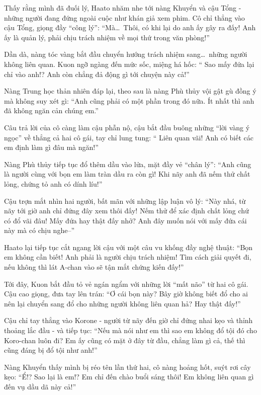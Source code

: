 \documentclass[../main.tex]{subfiles}
\begin{document}
Thấy rằng mình đã đuối lý, Haato nhăm nhe tới nàng Khuyển và cậu Tổng - những người đang đứng ngoài cuộc như khán giả xem phim. Cô chỉ thẳng vào cậu Tổng, giọng đầy ``công lý'': ``Mà\dots\ Thôi, có khi lại do anh ấy gây ra đấy! Anh ấy là quản lý, phải chịu trách nhiệm về mọi thứ trong văn phòng!''

Dần dà, nàng tóc vàng bắt đầu chuyển hướng trách nhiệm sang\dots\ những người không liên quan. Kuon ngỡ ngàng đến mức sốc, miệng há hốc: `` Sao mấy đứa lại chỉ vào anh!? Anh còn chẳng đả động gì tới chuyện này cả!''

Nàng Trung học thản nhiên đáp lại, theo sau là nàng Phù thủy vội gật gù đồng ý mà không suy xét gì: ``Anh cũng phải có một phần trong đó nữa. Ít nhất thì anh đã không ngăn cản chúng em.''

Câu trả lời của cô càng làm cậu phẫn nộ, cậu bắt đầu buông những ``lời vàng ý ngọc'' về thẳng cả hai cô gái, tay chỉ lung tung: `` Liên quan vãi! Anh có biết các em định làm gì đâu mà ngăn!''

Nàng Phù thủy tiếp tục đổ thêm dầu vào lửa, mặt đầy vẻ ``chân lý'': ``Anh cũng là người cùng với bọn em làm tràn dầu ra còn gì! Khi nãy anh đã nếm thử chất lỏng, chứng tỏ anh có dính líu!''

Cậu trợn mắt nhìn hai người, bất mãn với những lập luận vô lý: ``Này nhá, từ nãy tới giờ anh chỉ đứng đây xem thôi đấy! Nếm thử để xác định chất lỏng chứ có đổ vãi đâu! Mấy đứa hay thật đấy nhở? Anh đây muốn nói với mấy đứa cái này mà có chịu nghe--''

Haato lại tiếp tục cắt ngang lời cậu với một câu vu khống đầy nghệ thuật: ``Bọn em không cần biết! Anh phải là người chịu trách nhiệm! Tìm cách giải quyết đi, nếu không thì lát A-chan vào sẽ tận mắt chứng kiến đấy!''

Tới đây, Kuon bắt đầu tỏ vẻ ngán ngẩm với những lời ``mất não'' từ hai cô gái. Cậu cao giọng, đưa tay lên trán: ``Ơ cái bọn này? Bây giờ không biết đổ cho ai nên lại chuyển sang đổ cho những người không liên quan hả? Hay thật đấy!''

Cậu chỉ tay thẳng vào Korone - người từ nãy đến giờ chỉ đứng nhai kẹo và thỉnh thoảng lắc đầu - và tiếp tục: ``Nếu mà nói như em thì sao em không đổ tội đó cho Koro-chan luôn đi? Em ấy cũng có mặt ở đây từ đầu, chẳng làm gì cả, thế thì cũng đáng bị đổ tội như anh!''

Nàng Khuyển thấy mình bị réo tên lần thứ hai, cô nàng hoảng hốt, suýt rơi cây kẹo: ``Ể!? Sao lại là em!? Em chỉ đến chào buổi sáng thôi! Em không liên quan gì đến vụ dầu dã này cả!''
\end{document}

